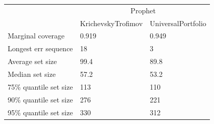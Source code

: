 \begin{tabular}{lll}
\toprule
& \multicolumn{2}{c}{Prophet} \\
& KrichevskyTrofimov & UniversalPortfolio \\
\midrule
Marginal coverage & 0.919 & 0.949 \\
Longest err sequence & 18 & 3 \\
Average set size & 99.4 & 89.8 \\
Median set size & 57.2 & 53.2 \\
75\% quantile set size & 113 & 110 \\
90\% quantile set size & 276 & 221 \\
95\% quantile set size & 330 & 312 \\
\bottomrule
\end{tabular}
